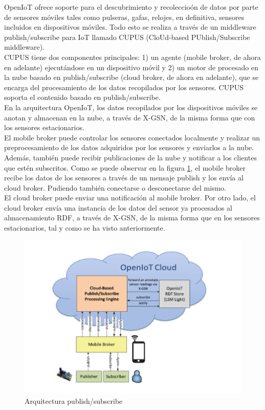 \documentclass[12pt, twoside]{book}
\begin{document}
OpenIoT ofrece soporte para el descubrimiento y recoleccioón de datos por parte de sensores móviles tales como pulseras, gafas, relojes, en definitiva, sensores incluidos en dispositivos móviles. Todo esto se realiza a través de un middleware publish/subscribe para IoT llamado CUPUS (CloUd-based PUblish/Subscribe middleware). \\
CUPUS tiene dos componentes principales: 1) un agente (mobile broker, de ahora en adelante) ejecutándose en un dispositivo móvil y 2) un motor de procesado en la nube basado en publish/subscribe (cloud broker, de ahora en adelante), que se encarga del procesamiento de los datos recopilados por los sensores. CUPUS soporta el contenido basado en publish/subscribe.\\
En la arquitectura OpenIoT, los datos recopilados por los dispositivos móviles se anotan y almacenan en la nube, a través de X-GSN, de la misma forma que con los sensores estacionarios. \\

El mobile broker puede controlar los sensores conectados localmente y realizar un preprocesamiento de los datos adquiridos por los sensores y enviarlos a la nube. Además, también puede recibir publicaciones de la nube y notificar a los clientes que estén subscritos. Como se puede observar en la figura \ref{L405}, el mobile broker recibe los datos de los sensores a través de un mensaje publish y los envía al cloud broker. Pudiendo también conectarse o desconectarse del mismo.\\

El cloud broker puede enviar una notificación al mobile broker. Por otro lado, el cloud broker envía una instancia de los datos del sensor ya procesados al almacenamiento RDF, a través de X-GSN, de la misma forma que en los sensores estacionarios, tal y como se ha visto anteriormente.

\begin{figure}[H]
\centering
\includegraphics[scale=0.9]{images/mobilebroker_openiot}
\caption{Arquitectura publish/subscribe}\label{L405}
\end{figure}
\end{document}
